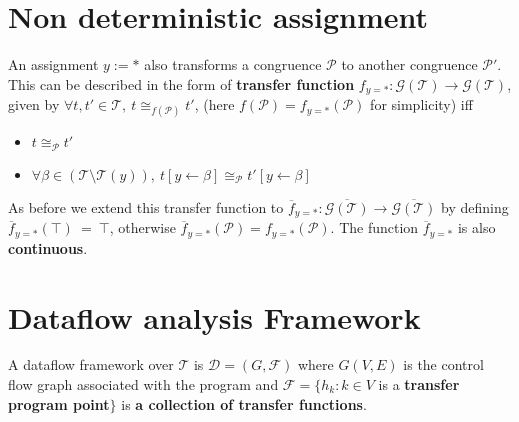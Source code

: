 \section{Non deterministic assignment}
\label{sec:NonDeterministicAssignment}
An assignment $y := *$ also transforms a congruence $\mathcal P$ to another 
congruence $\mathcal P'$. This can be described in the form of \textbf{transfer function} 
$f_{y = *}:\mathcal G(\mathcal T) \to \mathcal G(\mathcal T)$, given by
$\forall t, t' \in \mathcal T,\ t \cong_{f(\mathcal P)} t'$, (here 
$f(\mathcal P) = f_{y = *}(\mathcal P)$ for simplicity) iff
\begin{itemize}
    \item $t \cong_{\mathcal P} t'$
    \item $\forall \beta \in (\mathcal T \setminus \mathcal T(y)),\ t[y \leftarrow \beta] \cong_{\mathcal P} t'[y \leftarrow \beta]$
\end{itemize}
As before we extend this transfer function to 
$\overline{f}_{y=*} : \overline{\mathcal G(\mathcal T)} \to \overline{\mathcal G(\mathcal T)}$ 
by defining $\overline{f}_{y=*}(\top)\ =\ \top$, otherwise 
$\overline{f}_{y=*}(\mathcal P) = f_{y=*}(\mathcal P)$. The function 
$\overline{f}_{y=*}$ is also \textbf{continuous}.

\section{Dataflow analysis Framework}
\label{sec:DataflowAnalysisFramework}
A dataflow framework over $\mathcal T$ is $\mathcal D = (G, \mathcal F)$ where 
$G(V, E)$ is the control flow graph associated with the program and 
$\mathcal F = \{h_k : k \in V$ is a \textbf{transfer program point}$\}$ 
is \textbf{a collection of transfer functions}.

